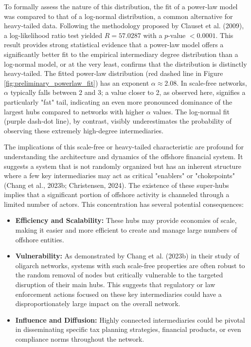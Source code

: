 To formally assess the nature of this distribution, the fit of a power-law model was compared to that of a log-normal distribution, a common alternative for heavy-tailed data. Following the methodology proposed by Clauset et al. (2009), a log-likelihood ratio test yielded $R = 57.0287$ with a $p$-value $< 0.0001$. This result provides strong statistical evidence that a power-law model offers a significantly better fit to the empirical intermediary degree distribution than a log-normal model, or at the very least, confirms that the distribution is distinctly heavy-tailed. The fitted power-law distribution (red dashed line in Figure \ref{fig:preliminary_powerlaw_fit}) has an exponent $\alpha \approx 2.08$. In scale-free networks, $\alpha$ typically falls between 2 and 3; a value closer to 2, as observed here, signifies a particularly "fat" tail, indicating an even more pronounced dominance of the largest hubs compared to networks with higher $\alpha$ values. The log-normal fit (purple dash-dot line), by contrast, visibly underestimates the probability of observing these extremely high-degree intermediaries.

The implications of this scale-free or heavy-tailed characteristic are profound for understanding the architecture and dynamics of the offshore financial system. It suggests a system that is not randomly organized but has an inherent structure where a few key intermediaries may act as critical "enablers" or "chokepoints" (Chang et al., 2023b; Christensen, 2024). The existence of these super-hubs implies that a significant portion of offshore activity is channeled through a limited number of actors. This concentration has several potential consequences:
\begin{itemize}
    \item \textbf{Efficiency and Scalability:} These hubs may provide economies of scale, making it easier and more efficient to create and manage large numbers of offshore entities.
    \item \textbf{Vulnerability:} As demonstrated by Chang et al. (2023b) in their study of oligarch networks, systems with such scale-free properties are often robust to the random removal of nodes but critically vulnerable to the targeted disruption of their main hubs. This suggests that regulatory or law enforcement actions focused on these key intermediaries could have a disproportionately large impact on the overall network.
    \item \textbf{Influence and Diffusion:} Highly connected intermediaries could be pivotal in disseminating specific tax planning strategies, financial products, or even compliance norms throughout the network.
\end{itemize}

